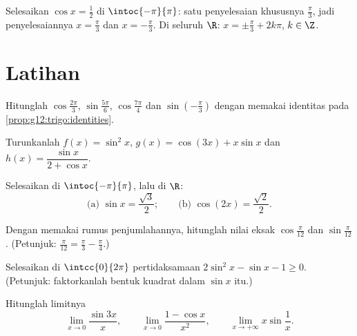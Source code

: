 \begin{example}\label{ex:g12:trigo:equation}
Selesaikan $\cos x = \frac12$ di $\intoc{-\pi}{\pi}$: satu penyelesaian
khususnya $\frac\pi3$, jadi penyelesaiannya $x = \frac\pi3$ dan
$x = -\frac\pi3$. Di seluruh $\R$: $x = \pm\frac\pi3 + 2k\pi$, $k \in \Z$.
\end{example}

\section{Latihan}

\begin{exercise}[$\star$]\label{exo:g12:trigo:1}
Hitunglah $\cos\frac{2\pi}{3}$, $\sin\frac{5\pi}{6}$, $\cos\frac{7\pi}{4}$ dan
$\sin\left(-\frac{\pi}{3}\right)$ dengan memakai identitas pada
\cref{prop:g12:trigo:identities}.
\end{exercise}

\begin{exercise}[$\star$]\label{exo:g12:trigo:2}
Turunkanlah $f(x) = \sin^2 x$, $g(x) = \cos(3x) + x\sin x$ dan
$h(x) = \dfrac{\sin x}{2 + \cos x}$.
\end{exercise}

\begin{exercise}[$\star$]\label{exo:g12:trigo:3}
Selesaikan di $\intoc{-\pi}{\pi}$, lalu di $\R$:
\[
\text{(a) } \sin x = \frac{\sqrt3}{2};
\qquad
\text{(b) } \cos\left(2x\right) = \frac{\sqrt2}{2} .
\]
\end{exercise}

\begin{exercise}[$\star\star$]\label{exo:g12:trigo:4}
Dengan memakai rumus penjumlahannya, hitunglah nilai eksak
$\cos\frac{\pi}{12}$ dan $\sin\frac{\pi}{12}$.
(Petunjuk: $\frac{\pi}{12} = \frac{\pi}{3} - \frac{\pi}{4}$.)
\end{exercise}

\begin{exercise}[$\star\star$]\label{exo:g12:trigo:5}
Selesaikan di $\intcc{0}{2\pi}$ pertidaksamaan $2\sin^2 x - \sin x - 1 \geq 0$.
(Petunjuk: faktorkanlah bentuk kuadrat dalam $\sin x$ itu.)
\end{exercise}

\begin{exercise}[$\star\star$]\label{exo:g12:trigo:6}
Hitunglah limitnya
\[
\lim_{x\to0} \frac{\sin 3x}{x}, \qquad
\lim_{x\to0} \frac{1 - \cos x}{x^2}, \qquad
\lim_{x\to+\infty} x \sin\frac{1}{x}.
\]
\end{exercise}

